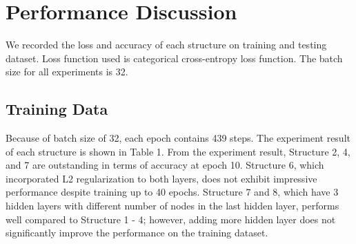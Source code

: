 \documentclass{article}
\begin{document}




\section{Performance Discussion}

We recorded the loss and accuracy of each structure on training and testing dataset. Loss function used is categorical cross-entropy loss function. The batch size for all experiments is 32. 

\subsection{Training Data}
Because of batch size of 32, each epoch contains 439 steps. The experiment result of each structure is shown in Table 1. From the experiment result, Structure 2, 4, and 7 are outstanding in terms of accuracy at epoch 10. Structure 6, which incorporated L2 regularization to both layers, does not exhibit impressive performance despite training up to 40 epochs. Structure 7 and 8, which have 3 hidden layers with different number of nodes in the last hidden layer, performs well compared to Structure 1 - 4; however, adding more hidden layer does not significantly improve the performance on the training dataset.
\end{document}
